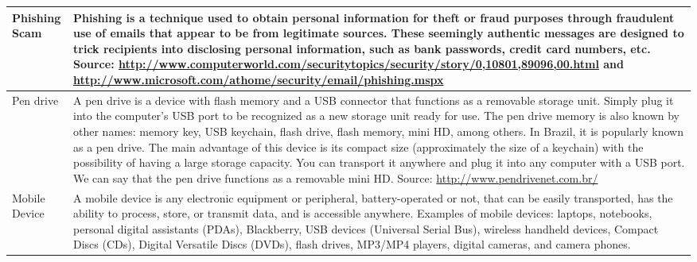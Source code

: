 \begin{longtable}{|>{\centering\arraybackslash}m{3cm}|>{\raggedright\arraybackslash}m{12cm}|}
\hline
Phishing Scam & Phishing is a technique used to obtain personal information for theft or fraud purposes through fraudulent use of emails that appear to be from legitimate sources. These seemingly authentic messages are designed to trick recipients into disclosing personal information, such as bank passwords, credit card numbers, etc.  
Source: \url{http://www.computerworld.com/securitytopics/security/story/0,10801,89096,00.html} and  
\url{http://www.microsoft.com/athome/security/email/phishing.mspx} \\
\hline
Pen drive & A pen drive is a device with flash memory and a USB connector that functions as a removable storage unit. Simply plug it into the computer's USB port to be recognized as a new storage unit ready for use.  
The pen drive memory is also known by other names: memory key, USB keychain, flash drive, flash memory, mini HD, among others. In Brazil, it is popularly known as a pen drive.  
The main advantage of this device is its compact size (approximately the size of a keychain) with the possibility of having a large storage capacity. You can transport it anywhere and plug it into any computer with a USB port. We can say that the pen drive functions as a removable mini HD.  
Source: \url{http://www.pendrivenet.com.br/} \\
\hline
Mobile Device & A mobile device is any electronic equipment or peripheral, battery-operated or not, that can be easily transported, has the ability to process, store, or transmit data, and is accessible anywhere.  
Examples of mobile devices: laptops, notebooks, personal digital assistants (PDAs), Blackberry, USB devices (Universal Serial Bus), wireless handheld devices, Compact Discs (CDs), Digital Versatile Discs (DVDs), flash drives, MP3/MP4 players, digital cameras, and camera phones. \\
\hline

\end{longtable}